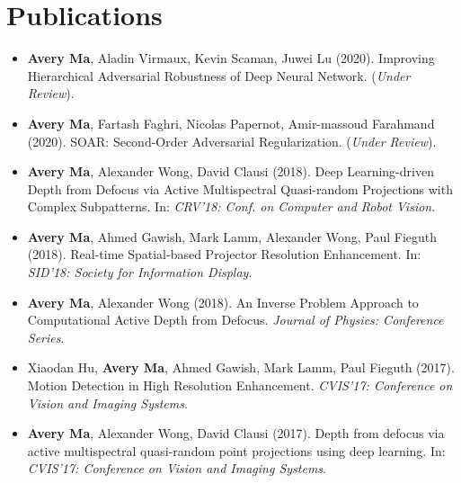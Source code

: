 \section*{Publications}
    \vspace{\postsubhead}
    \begin{adjustwidth}{\indentleft}{\indentright}
        \begin{itemize}
            \setlength\itemsep{0.6em}
            
            \item \textbf{Avery Ma}, Aladin Virmaux, Kevin Scaman, Juwei Lu (2020). Improving Hierarchical Adversarial Robustness of Deep Neural Network. (\textit{Under Review}).
            
            \item \textbf{Avery Ma}, Fartash Faghri, Nicolas Papernot, Amir-massoud Farahmand (2020). SOAR: Second-Order Adversarial Regularization. (\textit{Under Review}).
            
            
            \item \textbf{Avery Ma}, Alexander Wong, David Clausi (2018). Deep Learning-driven Depth from Defocus via Active Multispectral Quasi-random Projections with Complex Subpatterns. In: \emph{CRV'18: Conf. on Computer and Robot Vision}.
            
            \item \textbf{Avery Ma}, Ahmed Gawish, Mark Lamm, Alexander Wong, Paul Fieguth (2018). Real-time Spatial-based Projector Resolution Enhancement. In: \emph{SID'18: Society for Information Display}.
            
            \item \textbf{Avery Ma}, Alexander Wong (2018). An Inverse Problem Approach to Computational Active Depth from Defocus. \emph{Journal of Physics: Conference Series}.
            
            \item Xiaodan Hu, \textbf{Avery Ma}, Ahmed Gawish, Mark Lamm, Paul Fieguth (2017). Motion Detection in High Resolution Enhancement. \emph{CVIS'17: Conference on Vision and Imaging Systems}.
            
            \item \textbf{Avery Ma}, Alexander Wong, David Clausi (2017). Depth from defocus via active multispectral quasi-random point projections using deep learning. In: \emph{CVIS'17: Conference on Vision and Imaging Systems}.
           

\end{itemize}
\end{adjustwidth}
